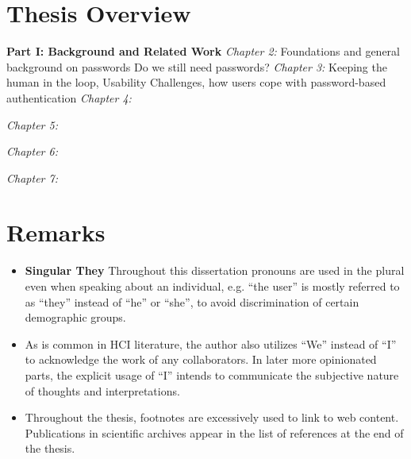 %	
%	


\section{Thesis Overview}
\textbf{Part I: Background and Related Work}
\textit{Chapter 2:}
Foundations and general background on passwords
Do we still need passwords?
\textit{Chapter 3:}
Keeping the human in the loop, Usability Challenges, how users cope with password-based authentication
\textit{Chapter 4:}

\textit{Chapter 5:}

\textit{Chapter 6:}

\textit{Chapter 7:}


\section{Remarks}
\begin{itemize}
\item \textbf{Singular They} Throughout this dissertation pronouns are used in the plural even when speaking about an individual, e.g. ``the user'' is mostly referred to as ``they'' instead of ``he'' or ``she'', to avoid discrimination of certain demographic groups. 
\item As is common in HCI literature, the author also utilizes ``We'' instead of ``I'' to acknowledge the work of any collaborators. In later more opinionated parts, the explicit usage of ``I'' intends to communicate the subjective nature of thoughts and interpretations.
\item Throughout the thesis, footnotes are excessively used to link to web content. Publications in scientific archives appear in the list of references at the end of the thesis.
\end{itemize}



